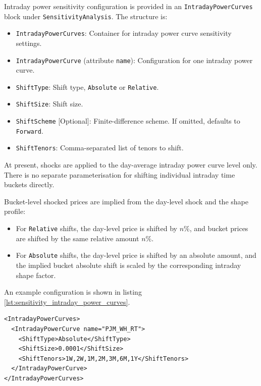 Intraday power sensitivity configuration is provided in an \lstinline!IntradayPowerCurves! block under
\lstinline!SensitivityAnalysis!. The structure is:

\begin{itemize}
\item \lstinline!IntradayPowerCurves!: Container for intraday power curve sensitivity settings.
\item \lstinline!IntradayPowerCurve! (attribute \lstinline!name!): Configuration for one intraday power curve.
\item \lstinline!ShiftType!: Shift type, \lstinline!Absolute! or \lstinline!Relative!.
\item \lstinline!ShiftSize!: Shift size.
\item \lstinline!ShiftScheme! [Optional]: Finite-difference scheme. If omitted, defaults to \lstinline!Forward!.
\item \lstinline!ShiftTenors!: Comma-separated list of tenors to shift.
\end{itemize}

At present, shocks are applied to the day-average intraday power curve level only. There is no separate
parameterisation for shifting individual intraday time buckets directly.

Bucket-level shocked prices are implied from the day-level shock and the shape profile:
\begin{itemize}
\item For \lstinline!Relative! shifts, the day-level price is shifted by $n\%$, and bucket prices are shifted by the
same relative amount $n\%$.
\item For \lstinline!Absolute! shifts, the day-level price is shifted by an absolute amount, and the implied bucket
absolute shift is scaled by the corresponding intraday shape factor.
\end{itemize}

An example configuration is shown in listing \ref{lst:sensitivity_intraday_power_curves}.

\begin{longlisting}
\begin{verbatim}
<IntradayPowerCurves>
  <IntradayPowerCurve name="PJM_WH_RT">
    <ShiftType>Absolute</ShiftType>
    <ShiftSize>0.0001</ShiftSize>
    <ShiftTenors>1W,2W,1M,2M,3M,6M,1Y</ShiftTenors>
  </IntradayPowerCurve>
</IntradayPowerCurves>
\end{verbatim}
\caption{Intraday power curve sensitivity configuration}
\label{lst:sensitivity_intraday_power_curves}
\end{longlisting}

